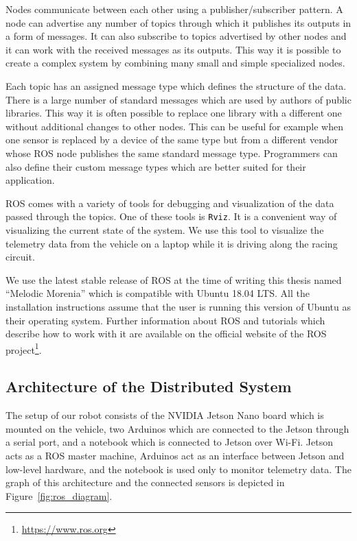 Nodes communicate between each other using a publisher/subscriber pattern. A node can advertise any number of topics through which it publishes its outputs in a form of messages. It can also subscribe to topics advertised by other nodes and it can work with the received messages as its outputs. This way it is possible to create a complex system by combining many small and simple specialized nodes.

Each topic has an assigned message type which defines the structure of the data. There is a large number of standard messages which are used by authors of public libraries. This way it is often possible to replace one library with a different one without additional changes to other nodes. This can be useful for example when one sensor is replaced by a device of the same type but from a different vendor whose \gls*{ROS} node publishes the same standard message type. Programmers can also define their custom message types which are better suited for their application.

\gls*{ROS} comes with a variety of tools for debugging and visualization of the data passed through the topics. One of these tools is \verb|Rviz|. It is a convenient way of visualizing the current state of the system. We use this tool to visualize the telemetry data from the vehicle on a laptop while it is driving along the racing circuit.

We use the latest stable release of \gls*{ROS} at the time of writing this thesis named ``Melodic Morenia'' which is compatible with Ubuntu 18.04 LTS. All the installation instructions assume that the user is running this version of Ubuntu as their operating system. Further information about \gls*{ROS} and tutorials which describe how to work with it are available on the official website of the \gls*{ROS} project\footnote{\url{https://www.ros.org}}.

\subsection{Architecture of the Distributed System}

The setup of our robot consists of the NVIDIA Jetson Nano board which is mounted on the vehicle, two Arduinos which are connected to the Jetson through a serial port, and a notebook which is connected to Jetson over Wi-Fi. Jetson acts as a \gls*{ROS} master machine, Arduinos act as an interface between Jetson and low-level hardware, and the notebook is used only to monitor telemetry data. The graph of this architecture and the connected sensors is depicted in Figure~\ref{fig:ros_diagram}.

